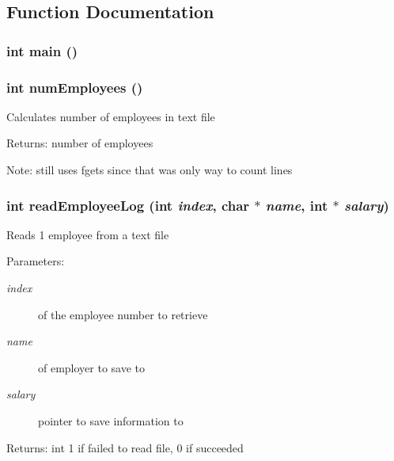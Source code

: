 \subsection{Function Documentation}
\subsubsection{\setlength{\rightskip}{0pt plus 5cm}int main ()}\label{part7_8c_e66f6b31b5ad750f1fe042a706a4e3d4}


\subsubsection{\setlength{\rightskip}{0pt plus 5cm}int num\-Employees ()}\label{part7_8c_801748b5d2d028f0482ce56bb43d331c}


Calculates number of employees in text file \begin{Desc}
\item[Returns:]number of employees \end{Desc}
\begin{Desc}
\item[Note:]still uses fgets since that was only way to count lines \end{Desc}
\subsubsection{\setlength{\rightskip}{0pt plus 5cm}int read\-Employee\-Log (int {\em index}, char $\ast$ {\em name}, int $\ast$ {\em salary})}\label{part7_8c_6eba06bb925710329353f8f4bcfa3192}


Reads 1 employee from a text file \begin{Desc}
\item[Parameters:]
\begin{description}
\item[{\em index}]of the employee number to retrieve \item[{\em name}]of employer to save to \item[{\em salary}]pointer to save information to \end{description}
\end{Desc}
\begin{Desc}
\item[Returns:]int 1 if failed to read file, 0 if succeeded \end{Desc}
